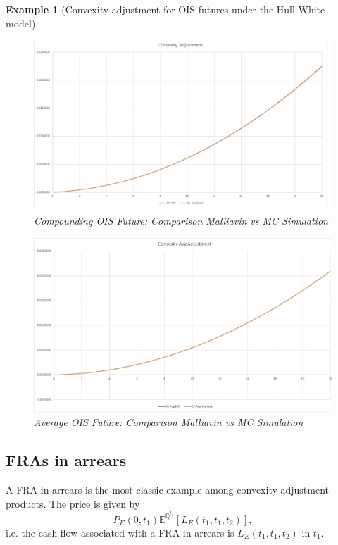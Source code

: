 \documentclass[a4paper,10pt]{article}
\newtheorem{example}[theorem]{Example}
\newcommand{\1}{\mathbf{1}}
\begin{document}
\begin{example}[Convexity adjustment for OIS futures under the Hull-White model]
\begin{figure}[H]
	\begin{center}
		\includegraphics[scale=0.3]{Figures/convexity_ois.jpg}
	\end{center}
	\caption{Compounding OIS Future: Comparison Malliavin vs MC Simulation}
	\label{fig:Futures}
\end{figure} 


\begin{figure}[H]
	\begin{center}
		\includegraphics[scale=0.3]{Figures/convexity_avg_ois.jpg}
	\end{center}
	\caption{Average OIS Future: Comparison Malliavin vs MC Simulation}
	\label{fig:Futures}
\end{figure} 
\end{example}

\subsection{FRAs in arrears}
A FRA in arrears is the most classic example among convexity adjustment products. The price is given by
\begin{equation}\label{FRAinArrear}
P_{E}(0,t_1)\mathbb{E}^{\mathbb{Q}^{t_1}}\left[L_{E}(t_1,t_1,t_2)\right],
\end{equation}
i.e. the cash flow associated with a FRA in arrears is $L_{E}(t_1,t_1,t_2)$ in $t_1$.
\end{document}
